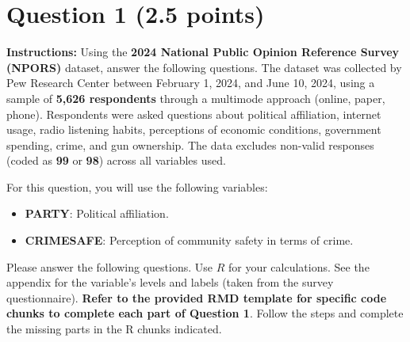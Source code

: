 \documentclass[11pt]{article}
\begin{document}
\newpage
\section*{Question 1 (2.5 points)}

\textbf{Instructions:} Using the \textbf{2024 National Public Opinion Reference Survey (NPORS)} dataset, answer the following questions. The dataset was collected by Pew Research Center between February 1, 2024, and June 10, 2024, using a sample of \textbf{5,626 respondents} through a multimode approach (online, paper, phone). Respondents were asked questions about political affiliation, internet usage, radio listening habits, perceptions of economic conditions, government spending, crime, and gun ownership. The data excludes non-valid responses (coded as \textbf{99} or \textbf{98}) across all variables used.

For this question, you will use the following variables:
\begin{itemize}
    \item \textbf{PARTY}: Political affiliation.
    \item \textbf{CRIMESAFE}: Perception of community safety in terms of crime.
\end{itemize}

\noindent Please answer the following questions. Use $R$ for your calculations. See the appendix for the variable's levels and labels (taken from the survey questionnaire). \textbf{Refer to the provided RMD template for specific code chunks to complete each part of Question 1}. Follow the steps and complete the missing parts in the R chunks indicated.
\end{document}
